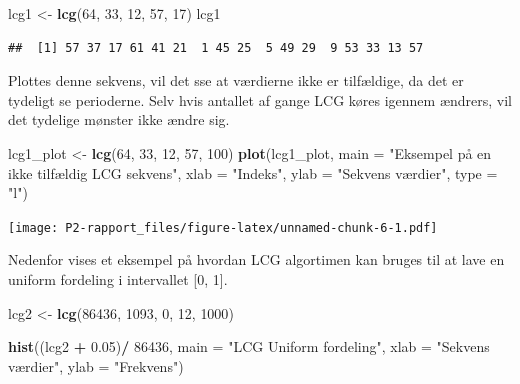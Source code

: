 \documentclass[
]{book}
\newenvironment{Shaded}{\begin{snugshade}}{\end{snugshade}}
\newcommand{\DataTypeTok}[1]{\textcolor[rgb]{0.13,0.29,0.53}{#1}}
\newcommand{\DecValTok}[1]{\textcolor[rgb]{0.00,0.00,0.81}{#1}}
\newcommand{\FloatTok}[1]{\textcolor[rgb]{0.00,0.00,0.81}{#1}}
\newcommand{\KeywordTok}[1]{\textcolor[rgb]{0.13,0.29,0.53}{\textbf{#1}}}
\newcommand{\NormalTok}[1]{#1}
\newcommand{\OperatorTok}[1]{\textcolor[rgb]{0.81,0.36,0.00}{\textbf{#1}}}
\newcommand{\StringTok}[1]{\textcolor[rgb]{0.31,0.60,0.02}{#1}}
\theoremstyle{definition}
\theoremstyle{definition}
\theoremstyle{definition}
\theoremstyle{remark}
\begin{document}
\begin{Shaded}
\begin{Highlighting}[]
\NormalTok{lcg1 <-}\StringTok{ }\KeywordTok{lcg}\NormalTok{(}\DecValTok{64}\NormalTok{, }\DecValTok{33}\NormalTok{, }\DecValTok{12}\NormalTok{, }\DecValTok{57}\NormalTok{, }\DecValTok{17}\NormalTok{)}
\NormalTok{lcg1}
\end{Highlighting}
\end{Shaded}

\begin{verbatim}
##  [1] 57 37 17 61 41 21  1 45 25  5 49 29  9 53 33 13 57
\end{verbatim}

Plottes denne sekvens, vil det sse at værdierne ikke er tilfældige, da det er tydeligt se perioderne. Selv hvis antallet af gange LCG køres igennem ændrers, vil det tydelige mønster ikke ændre sig.

\begin{Shaded}
\begin{Highlighting}[]
\NormalTok{lcg1_plot <-}\StringTok{ }\KeywordTok{lcg}\NormalTok{(}\DecValTok{64}\NormalTok{, }\DecValTok{33}\NormalTok{, }\DecValTok{12}\NormalTok{, }\DecValTok{57}\NormalTok{, }\DecValTok{100}\NormalTok{)}
\KeywordTok{plot}\NormalTok{(lcg1_plot, }\DataTypeTok{main =} \StringTok{"Eksempel på en ikke tilfældig LCG sekvens"}\NormalTok{, }
     \DataTypeTok{xlab =} \StringTok{"Indeks"}\NormalTok{, }\DataTypeTok{ylab =} \StringTok{"Sekvens værdier"}\NormalTok{, }\DataTypeTok{type =} \StringTok{"l"}\NormalTok{)}
\end{Highlighting}
\end{Shaded}

\texttt{[image: P2-rapport\_files/figure-latex/unnamed-chunk-6-1.pdf]}

Nedenfor vises et eksempel på hvordan LCG algortimen kan bruges til at lave en uniform fordeling i intervallet {[}0, 1{]}.

\begin{Shaded}
\begin{Highlighting}[]
\NormalTok{lcg2 <-}\StringTok{ }\KeywordTok{lcg}\NormalTok{(}\DecValTok{86436}\NormalTok{, }\DecValTok{1093}\NormalTok{, }\DecValTok{0}\NormalTok{, }\DecValTok{12}\NormalTok{, }\DecValTok{1000}\NormalTok{)}

\KeywordTok{hist}\NormalTok{((lcg2 }\OperatorTok{+}\StringTok{ }\FloatTok{0.05}\NormalTok{)}\OperatorTok{/}\StringTok{ }\DecValTok{86436}\NormalTok{, }\DataTypeTok{main =} \StringTok{"LCG Uniform fordeling"}\NormalTok{, }
     \DataTypeTok{xlab =} \StringTok{"Sekvens værdier"}\NormalTok{, }\DataTypeTok{ylab =} \StringTok{"Frekvens"}\NormalTok{)}
\end{Highlighting}
\end{Shaded}
\end{document}

